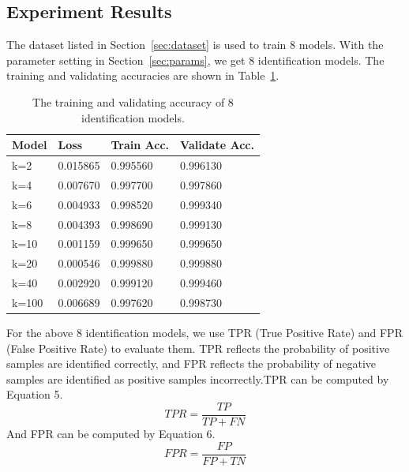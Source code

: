 \documentclass[conference]{IEEEtran}
\begin{document}
\subsection{Experiment Results}
\label{sec:experimentresults}
The dataset listed in Section~\ref{sec:dataset} is used to train 8 models. With the parameter setting in Section~\ref{sec:params}, we get 8 identification models. The training and validating accuracies are shown in Table~\ref{tab:acc4models}.
\begin{table}
  \caption{The training and validating accuracy of 8 identification models.}
  \label{tab:acc4models}
  \centering
  \begin{tabular}{p{1cm}p{1.5cm}p{1.5cm}p{2cm}}
    \hline
    Model & Loss &Train Acc. &Validate Acc.\\
    \hline
    k=2      & 0.015865  & 0.995560  &0.996130  \\
    k=4      & 0.007670  & 0.997700  &0.997860 \\
    k=6      & 0.004933  & 0.998520  &0.999340 \\
    k=8      & 0.004393  & 0.998690  &0.999130 \\
    k=10     & 0.001159  & 0.999650  &0.999650  \\
    k=20     & 0.000546  & 0.999880  &0.999880 \\
    k=40     & 0.002920  & 0.999120  &0.999460  \\
    k=100    & 0.006689  & 0.997620  &0.998730  \\
    \hline
  \end{tabular}
\end{table}

For the above 8 identification models, we use TPR (True Positive Rate) and FPR (False Positive Rate) to evaluate them. TPR reflects the probability of positive samples are identified correctly, and FPR reflects the probability of negative samples are identified as positive samples incorrectly.TPR can be computed by Equation 5.
\begin{equation}
TPR = \frac{{TP}}{{TP + FN}}
\end{equation}
And FPR can be computed by Equation 6.
\begin{equation}
FPR = \frac{{FP}}{{FP + TN}}
\end{equation}
\end{document}
